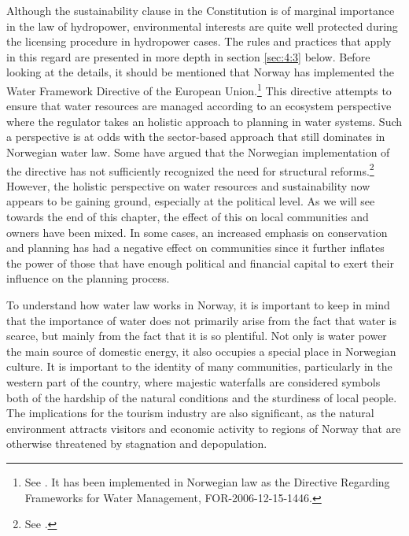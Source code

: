 Although the sustainability clause in the Constitution is of marginal importance in the law of hydropower, environmental interests are quite well protected during the licensing procedure in hydropower cases. The rules and practices that apply in this regard are presented in more depth in section \ref{sec:4:3} below. Before looking at the details, it should be mentioned that Norway has implemented the Water Framework Directive of the European Union.\footnote{See \cite{water00}. It has been implemented in Norwegian law as the Directive Regarding Frameworks for Water Management, FOR-2006-12-15-1446.} This directive attempts to ensure that water resources are managed according to an ecosystem perspective where the regulator takes an holistic approach to planning in water systems. Such a perspective is at odds with the sector-based approach that still dominates in Norwegian water law. Some have argued that the Norwegian implementation of the directive has not sufficiently recognized the need for structural reforms.\footnote{See \cite{hanssen14}.} However, the holistic perspective on water resources and sustainability now appears to be gaining ground, especially at the political level. As we will see towards the end of this chapter, the effect of this on local communities and owners have been mixed. In some cases, an increased emphasis on conservation and planning has had a negative effect on communities since it further inflates the power of those that have enough political and financial capital to exert their influence on the planning process. %

To understand how water law works in Norway, it is important to keep in mind that the importance of water does not primarily arise from the fact that water is scarce, but mainly from the fact that it is so plentiful. Not only is water power the main source of domestic energy, it also occupies a special place in Norwegian culture. It is important to the identity of many communities, particularly in the western part of the country, where majestic waterfalls are considered symbols both of the hardship of the natural conditions and the sturdiness of local people. The implications for the tourism industry are also significant, as the natural environment attracts visitors and economic activity to regions of Norway that are otherwise threatened by stagnation and depopulation.

